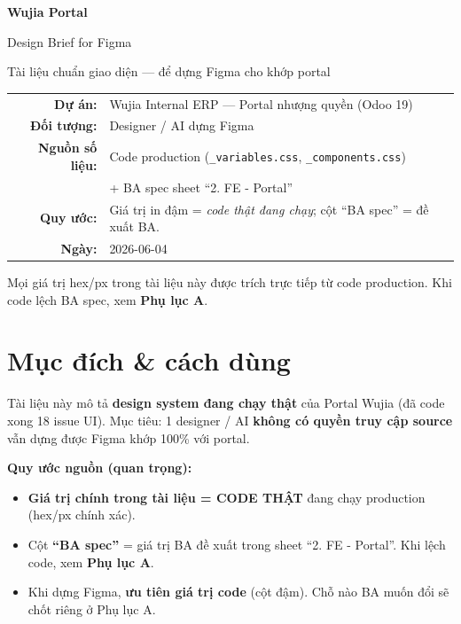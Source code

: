 \documentclass[11pt,a4paper]{article}
\begin{document}
\begin{titlepage}
\centering
\vspace*{3cm}
{\Huge\bfseries\color{wjprimary} Wujia Portal\par}
\vspace{0.6cm}
{\LARGE Design Brief for Figma\par}
\vspace{0.4cm}
{\large Tài liệu chuẩn giao diện — để dựng Figma cho khớp portal\par}
\vspace{2cm}
\begin{tabular}{rl}
\textbf{Dự án:} & Wujia Internal ERP — Portal nhượng quyền (Odoo 19)\\[4pt]
\textbf{Đối tượng:} & Designer / AI dựng Figma\\[4pt]
\textbf{Nguồn số liệu:} & Code production (\texttt{\_variables.css}, \texttt{\_components.css})\\[4pt]
& + BA spec sheet ``2. FE - Portal''\\[4pt]
\textbf{Quy ước:} & Giá trị in đậm = \emph{code thật đang chạy}; cột ``BA spec'' = đề xuất BA.\\[4pt]
\textbf{Ngày:} & 2026-06-04\\
\end{tabular}
\vfill
{\small Mọi giá trị hex/px trong tài liệu này được trích trực tiếp từ code production.
Khi code lệch BA spec, xem \textbf{Phụ lục A}.\par}
\end{titlepage}

\tableofcontents
\newpage

\section{Mục đích \& cách dùng}

Tài liệu này mô tả \textbf{design system đang chạy thật} của Portal Wujia (đã code xong 18 issue UI).
Mục tiêu: 1 designer / AI \textbf{không có quyền truy cập source} vẫn dựng được Figma khớp 100\% với portal.

\textbf{Quy ước nguồn (quan trọng):}
\begin{itemize}
\item \textbf{Giá trị chính trong tài liệu = CODE THẬT} đang chạy production (hex/px chính xác).
\item Cột \textbf{``BA spec''} = giá trị BA đề xuất trong sheet ``2. FE - Portal''. Khi lệch code, xem \textbf{Phụ lục A}.
\item Khi dựng Figma, \textbf{ưu tiên giá trị code} (cột đậm). Chỗ nào BA muốn đổi sẽ chốt riêng ở Phụ lục A.
\end{itemize}
\end{document}
